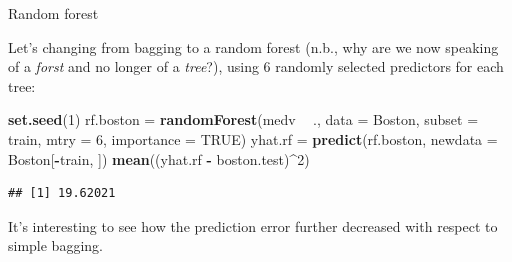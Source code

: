 \documentclass[10pt,ignorenonframetext,]{beamer}
\newenvironment{Shaded}{\begin{snugshade}}{\end{snugshade}}
\newcommand{\KeywordTok}[1]{\textcolor[rgb]{0.13,0.29,0.53}{\textbf{#1}}}
\newcommand{\DataTypeTok}[1]{\textcolor[rgb]{0.13,0.29,0.53}{#1}}
\newcommand{\DecValTok}[1]{\textcolor[rgb]{0.00,0.00,0.81}{#1}}
\newcommand{\StringTok}[1]{\textcolor[rgb]{0.31,0.60,0.02}{#1}}
\newcommand{\OtherTok}[1]{\textcolor[rgb]{0.56,0.35,0.01}{#1}}
\newcommand{\OperatorTok}[1]{\textcolor[rgb]{0.81,0.36,0.00}{\textbf{#1}}}
\newcommand{\NormalTok}[1]{#1}
\begin{document}
\begin{frame}[fragile]

\begin{block}{Random forest}

\vspace{2mm}

Let's changing from bagging to a random forest (n.b., why are we now
speaking of a \emph{forst} and no longer of a \emph{tree}?), using 6
randomly selected predictors for each tree:

\scriptsize

\begin{Shaded}
\begin{Highlighting}[]
\KeywordTok{set.seed}\NormalTok{(}\DecValTok{1}\NormalTok{)}
\NormalTok{rf.boston =}\StringTok{ }\KeywordTok{randomForest}\NormalTok{(medv }\OperatorTok{~}\StringTok{ }\NormalTok{., }\DataTypeTok{data =}\NormalTok{ Boston, }\DataTypeTok{subset =}\NormalTok{ train, }\DataTypeTok{mtry =} \DecValTok{6}\NormalTok{, }
    \DataTypeTok{importance =} \OtherTok{TRUE}\NormalTok{)}
\NormalTok{yhat.rf =}\StringTok{ }\KeywordTok{predict}\NormalTok{(rf.boston, }\DataTypeTok{newdata =}\NormalTok{ Boston[}\OperatorTok{-}\NormalTok{train, ])}
\KeywordTok{mean}\NormalTok{((yhat.rf }\OperatorTok{-}\StringTok{ }\NormalTok{boston.test)}\OperatorTok{^}\DecValTok{2}\NormalTok{)}
\end{Highlighting}
\end{Shaded}

\begin{verbatim}
## [1] 19.62021
\end{verbatim}

\vspace{2mm} \normalsize
It's interesting to see how the prediction error further decreased with
respect to simple bagging.

\end{block}

\end{frame}
\end{document}
